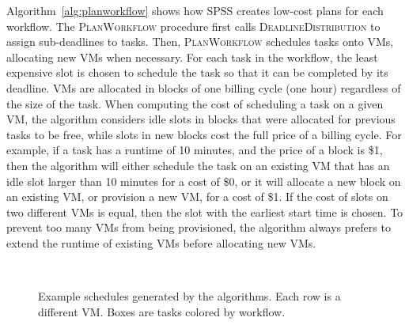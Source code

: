 \documentclass[conference]{IEEEtran}
\begin{document}
Algorithm~\ref{alg:planworkflow} shows how SPSS creates low-cost plans for each
workflow. The \textsc{PlanWorkflow} procedure first calls
\textsc{DeadlineDistribution} to assign sub-deadlines to tasks.
Then, \textsc{PlanWorkflow} schedules
tasks onto VMs, allocating new VMs when necessary. For each task in the
workflow, the least expensive slot is chosen to schedule the task so that it can
be completed by  its deadline. VMs are allocated in blocks of one billing cycle
(one hour) regardless of the size of the task. When computing the cost of
scheduling a task on a given VM, the algorithm considers idle slots in blocks
that were allocated for previous tasks to be free, while slots in new blocks
cost the full price of a billing cycle. 
For example, if a task has a runtime of
10 minutes, and the price of a block is \$1, then the algorithm will either
schedule the task on an existing VM that has an idle slot larger than 10
minutes for a cost of \$0, or it will allocate a new block on an existing VM,
or provision a new VM, for a cost of \$1. 
If the cost of slots on two different
VMs is equal, then the slot with the earliest start time is chosen. To prevent too
many VMs from being provisioned, the algorithm always prefers to extend the
runtime of existing VMs before allocating new VMs. 

\begin{figure}[tb] 
  \centering
  \\
  \caption[Example schedules generated by the algorithms]{Example
  schedules generated by the algorithms. Each row is a different
  VM. Boxes are tasks colored by workflow.}
  \label{fig:algorithm-example}
\end{figure}
\end{document}
